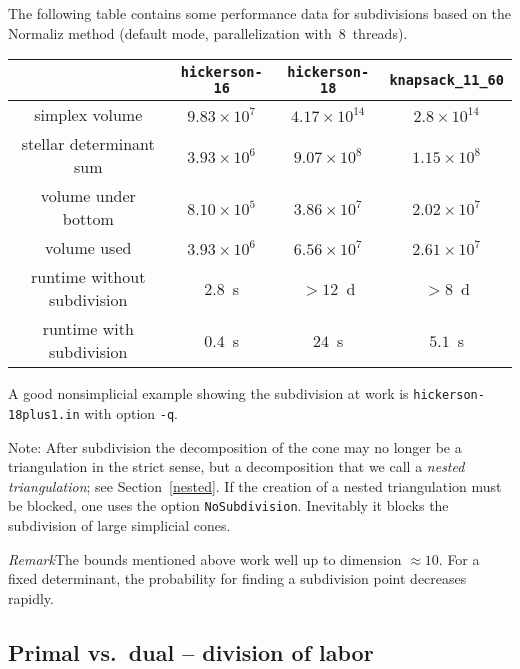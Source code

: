\documentclass[12pt,a4paper]{scrartcl}
\theoremstyle{definition}
\def\ttt{\texttt}
\begin{document}
The following table contains some performance data for subdivisions based on the Normaliz method (default mode, parallelization with~$8$~threads).
\begin{center}
	\setlength{\tabcolsep}{3.2pt}
	\renewcommand{\arraystretch}{1.2}
	\begin{tabular}{|c|c|c|c|}
		\hline
		& \ttt{hickerson-16} & \ttt{hickerson-18} & \ttt{knapsack\_11\_60}  \\ \hline
		simplex volume & $9.83\times 10^7$ & $4.17\times 10^{14}$ & $2.8\times 10^{14}$ \\ \hline
		stellar determinant sum & $3.93\times 10^6$  & $9.07\times 10^8$  & $1.15\times 10^8$\\ \hline
		volume under bottom  & $8.10\times 10^5$ & $3.86\times 10^7$ & $2.02\times 10^7$ \\ \hline
		volume used     & $3.93\times 10^6$ & $6.56\times 10^7$ & $2.61\times 10^7$ \\ \hline
		runtime without subdivision   &  $2.8$~s & $>12$~d &  $>8$~d \\ \hline
		runtime with subdivision    &  $0.4$~s & $24$~s & $5.1$~s \\ \hline
	\end{tabular}
\end{center}

A good nonsimplicial example showing the subdivision at work is \verb|hickerson-18plus1.in| with option \verb|-q|.

Note: After subdivision the decomposition of the cone may no longer be a triangulation in the strict sense, but a decomposition that we call a \emph{nested triangulation}; see Section~\ref{nested}. If the creation of a nested triangulation must be blocked, one uses the option \verb|NoSubdivision|. Inevitably it blocks the subdivision of large simplicial cones.

\emph{Remark}\enspace The bounds mentioned above work well up to dimension $\approx 10$. For a fixed determinant, the probability for finding a subdivision point decreases rapidly.

\subsection{Primal vs.\ dual -- division of labor}\label{div_labor}

\end{document}
